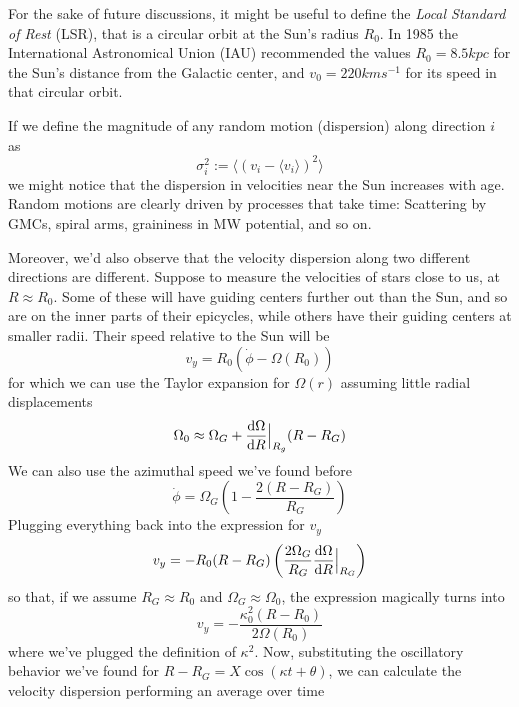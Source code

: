 For the sake of future discussions, it might be useful to define the \emph{Local Standard of Rest} (LSR), that is a circular orbit at the Sun’s radius $R_{0}$. In 1985 the International Astronomical Union (IAU) recommended the values $R_{0} = 8.5\unit{kpc}$ for the Sun’s distance from the Galactic center, and $v_{0} = 220\unit{km}\unit{s}^{-1}$ for its speed in that circular orbit.
\par If we define the magnitude of any random motion (dispersion) along direction $i$ as 
\begin{equation*}
    \sigma_{i}^{2} := \langle (v_{i}-\langle v_{i} \rangle)^{2}\rangle
\end{equation*}
we might notice that the dispersion in velocities near the Sun increases with age. Random motions are clearly driven by processes that take time: Scattering by GMCs, spiral arms, graininess in MW potential, and so on.
\par Moreover, we'd also observe that the velocity dispersion along two different directions are different. Suppose to measure the velocities of stars close to us, at $R\approx R_{0}$. Some of these will have guiding centers further out than the Sun, and so are on the inner parts of their epicycles, while others have their guiding centers at smaller radii. Their speed relative to the Sun will be
\begin{equation*}
    v_{y} = R_{0}(\dot{\phi}-\Omega(R_{0}))
\end{equation*}
for which we can use the Taylor expansion for $\Omega(r)$ assuming little radial displacements
\begin{equation*}
    \Omega_{0} \approx \Omega_{G} +\frac{\text{d}\Omega}{\text{d}R}\Big|_{R_{g}}(R-R_{G})
\end{equation*}
We can also use the azimuthal speed we've found before
\begin{equation*}
    \dot{\phi} = \Omega_{G}\left(1-\frac{2(R-R_{G})}{R_{G}}\right)
\end{equation*}
Plugging everything back into the expression for $v_{y}$
\begin{equation*}
    v_{y} = -R_{0}(R-R_{G})\left(\frac{2\Omega_{G}}{R_{G}}\frac{\text{d}\Omega}{\text{d}R}\Big|_{R_{G}}\right)
\end{equation*}
so that, if we assume $R_{G}\approx R_{0}$ and $\Omega_{G}\approx \Omega_{0}$, the expression magically turns into 
\begin{equation*}
    v_{y} = -\frac{\kappa_{0}^{2}(R-R_{0})}{2\Omega(R_{0})}
\end{equation*}
where we've plugged the definition of $\kappa^{2}$. Now, substituting the oscillatory behavior we've found for $R-R_{G}=X\cos(\kappa t +\theta)$, we can calculate the velocity dispersion performing an average over time
